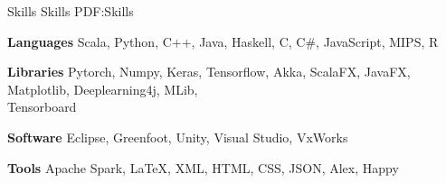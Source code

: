 \Section
{Skills}
{Skills}
{PDF:Skills}

\Entry
\textbf{Languages}
\Gap
Scala, Python, C++, Java, Haskell, C, C\#, JavaScript, MIPS, R

\BigGap
\Entry
\textbf{Libraries}
\Gap
Pytorch, Numpy, Keras, Tensorflow, Akka, ScalaFX, JavaFX, Matplotlib, Deeplearning4j, MLib, \\Tensorboard

\BigGap
\Entry
\textbf{Software}
\Gap
Eclipse, Greenfoot, Unity, Visual Studio, VxWorks

\BigGap
\Entry
\textbf{Tools}
\Gap
Apache Spark, LaTeX, XML, HTML, CSS, JSON, Alex, Happy